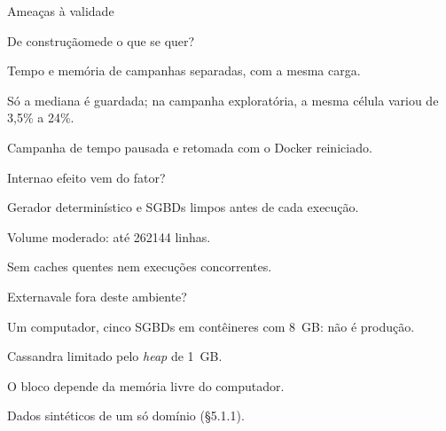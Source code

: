 \begin{frame}{Ameaças à validade}
  \begingroup\footnotesize{}%
  \begin{minipage}[t]{0.32\textwidth}\vspace{0pt}
    \begin{painel}{De construção}{mede o que se quer?}
      \begin{bklista}
        \item Tempo e memória de campanhas separadas, com a mesma carga.
        \item Só a mediana é guardada; na campanha exploratória, a mesma célula variou de
              3,5\% a 24\%.
        \item Campanha de tempo pausada e retomada com o Docker reiniciado.
      \end{bklista}
    \end{painel}
  \end{minipage}\hfill
  \begin{minipage}[t]{0.32\textwidth}\vspace{0pt}
    \begin{painel}{Interna}{o efeito vem do fator?}
      \begin{bklista}
        \item Gerador determinístico e SGBDs limpos antes de cada execução.
        \item Volume moderado: até \num{262144} linhas.
        \item Sem caches quentes nem execuções concorrentes.
      \end{bklista}
    \end{painel}
  \end{minipage}\hfill
  \begin{minipage}[t]{0.32\textwidth}\vspace{0pt}
    \begin{painel}{Externa}{vale fora deste ambiente?}
      \begin{bklista}
        \item Um computador, cinco SGBDs em contêineres com 8~GB: não é produção.
        \item Cassandra limitado pelo \textit{heap} de 1~GB.
        \item O bloco depende da memória livre do computador.
        \item Dados sintéticos de um só domínio (§5.1.1).
      \end{bklista}
    \end{painel}
  \end{minipage}\par
  \endgroup
  \vfill
\end{frame}

